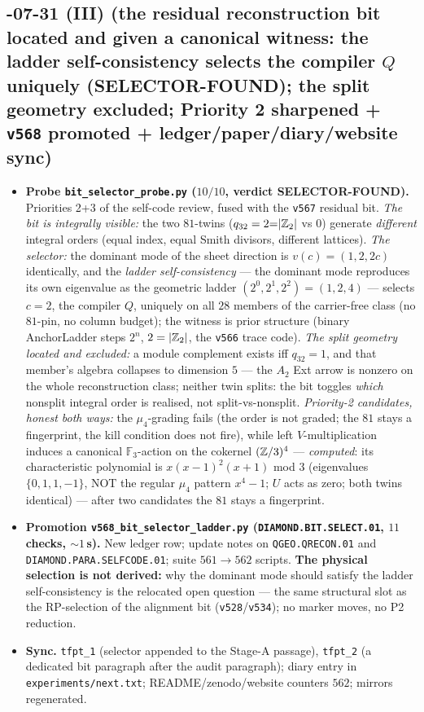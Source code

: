 \documentclass[11pt]{article}
\begin{document}
\subsection*{-07-31 (III) (the residual reconstruction bit located and given a canonical witness: the ladder self-consistency selects the compiler $Q$ uniquely (SELECTOR-FOUND); the split geometry excluded; Priority 2 sharpened + \texttt{v568} promoted + ledger/paper/diary/website sync)}
\begin{itemize}[leftmargin=1.5em]
\item \textbf{Probe \texttt{bit\_selector\_probe.py} ($10/10$, verdict SELECTOR-FOUND).}
Priorities 2+3 of the self-code review, fused with the \texttt{v567} residual bit.
\emph{The bit is integrally visible:} the two $81$-twins ($q_{32}=2{=}|\mathbb{Z}_2|$ vs $0$)
generate \emph{different} integral orders (equal index, equal Smith divisors, different
lattices).  \emph{The selector:} the dominant mode of the sheet direction is $v(c)=(1,2,2c)$
identically, and the \emph{ladder self-consistency} --- the dominant mode reproduces its own
eigenvalue as the geometric ladder $(2^0,2^1,2^2)=(1,2,4)$ --- selects $c=2$, the compiler
$Q$, uniquely on all $28$ members of the carrier-free class (no $81$-pin, no column budget);
the witness is prior structure (binary AnchorLadder steps $2^n$, $2=|\mathbb{Z}_2|$, the \texttt{v566}
trace code).  \emph{The split geometry located and excluded:} a module complement exists iff
$q_{32}=1$, and that member's algebra collapses to dimension $5$ --- the $A_2$ Ext arrow is
nonzero on the whole reconstruction class; neither twin splits: the bit toggles \emph{which}
nonsplit integral order is realised, not split-vs-nonsplit.  \emph{Priority-2 candidates,
honest both ways:} the $\mu_4$-grading fails (the order is not graded; the $81$ stays a
fingerprint, the kill condition does not fire), while left $V$-multiplication induces a
canonical $\mathbb F_3$-action on the cokernel $(\mathbb{Z}/3)^4$ --- \emph{computed}: its
characteristic polynomial is $x(x-1)^2(x+1)$ mod $3$ (eigenvalues $\{0,1,1,-1\}$, NOT the
regular $\mu_4$ pattern $x^4-1$; $U$ acts as zero; both twins identical) --- after two
candidates the $81$ stays a fingerprint.
\item \textbf{Promotion \texttt{v568\_bit\_selector\_ladder.py} (\texttt{DIAMOND.BIT.SELECT.01},
$11$ checks, ${\sim}1$\,s).} New ledger row; update notes on \texttt{QGEO.QRECON.01} and
\texttt{DIAMOND.PARA.SELFCODE.01}; suite $561\to562$ scripts.  \textbf{The physical selection
is not derived:} why the dominant mode should satisfy the ladder self-consistency is the
relocated open question --- the same structural slot as the RP-selection of the alignment bit
(\texttt{v528}/\texttt{v534}); no marker moves, no P2 reduction.
\item \textbf{Sync.} \texttt{tfpt\_1} (selector appended to the Stage-A passage),
\texttt{tfpt\_2} (a dedicated bit paragraph after the audit paragraph); diary entry in
\texttt{experiments/next.txt}; README/zenodo/website counters $562$; mirrors regenerated.
\end{itemize}
\end{document}
